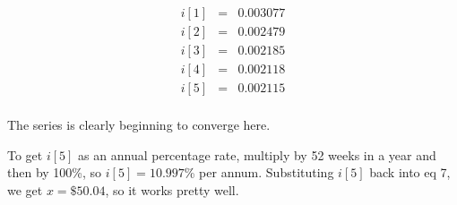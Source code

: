 \begin{eqnarray*}
       i[1]&=&0.003077\\
       i[2]&=&0.002479\\
       i[3]&=&0.002185\\
       i[4]&=&0.002118\\
       i[5]&=&0.002115\\
\end{eqnarray*}

     The series is clearly beginning to converge here.

     To get $i[5]$ as an annual percentage rate, multiply by 52 weeks
     in a year and then by 100\%, so $i[5] = 10.997$\% per annum.
     Substituting $i[5]$ back into eq 7, we get $x = \$50.04$, so it
     works pretty well.


\Ref
 

